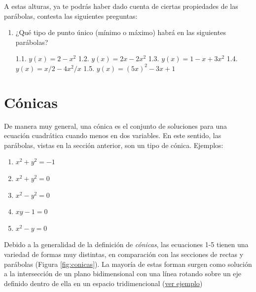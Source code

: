 \documentclass[
]{book}
\providecommand{\tightlist}{%
  \setlength{\itemsep}{0pt}\setlength{\parskip}{0pt}}
\begin{document}
A estas alturas, ya te podrás haber dado cuenta de ciertas propiedades de las parábolas, contesta las siguientes preguntas:

\begin{enumerate}
\def\labelenumi{\arabic{enumi}.}
\item
  ¿Qué tipo de punto único (mínimo o máximo) habrá en las siguientes parábolas?

  1.1. \(y(x) = 2 - x^2\)
  1.2. \(y(x) = 2x - 2x^2\)
  1.3. \(y(x) = 1 - x + 3x^2\)
  1.4. \(y(x) = x/2 - 4x^2/x\)
  1.5. \(y(x) = (5x)^2 - 3x + 1\)
\end{enumerate}

\hypertarget{cuxf3nicas}{%
\section{Cónicas}\label{cuxf3nicas}}

De manera muy general, una cónica es el conjunto de soluciones para una ecuación cuadrática cuando menos en dos variables. En este sentido, las parábolas, vistas en la sección anterior, son un tipo de cónica. Ejemplos:

\begin{enumerate}
\def\labelenumi{\arabic{enumi}.}
\tightlist
\item
  \(x^2 + y^2 = -1\)
\item
  \(x^2 + y^2 = 0\)
\item
  \(x^2 - y^2 = 0\)
\item
  \(xy - 1 = 0\)
\item
  \(x^2 - y = 0\)
\end{enumerate}

Debido a la generalidad de la definición de \emph{cónicas}, las ecuaciones 1-5 tienen una variedad de formas muy distintas, en comparación con las secciones de rectas y parábolas (Figura \ref{fig:conicas}). La mayoría de estas forman surgen como solución a la intersección de un plano bidimensional con una línea rotando sobre un eje definido dentro de ella en un espacio tridimencional (\href{https://www.mathplanet.com/Oldsite/media/28029/conic.png}{ver ejemplo})
\end{document}
